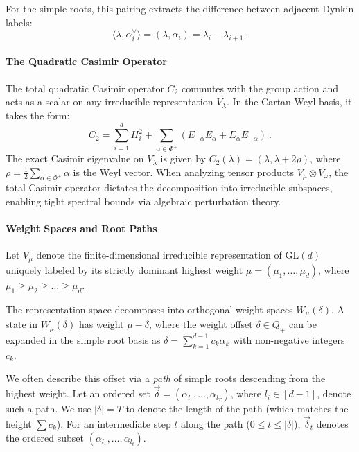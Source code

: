 \documentclass[11pt,letterpaper]{article}
\begin{document}
For the simple roots, this pairing extracts the difference between adjacent Dynkin labels:
\begin{equation}
    \langle \lambda, \alpha_i^\vee \rangle = (\lambda, \alpha_i) = \lambda_i - \lambda_{i+1} \ .
\end{equation}

\paragraph{The Quadratic Casimir Operator}
The total quadratic Casimir operator $C_2$ commutes with the group action and acts as a scalar on any irreducible representation $V_\lambda$. In the Cartan-Weyl basis, it takes the form:
\begin{equation}
    C_2 = \sum_{i=1}^d H_i^2 + \sum_{\alpha\in\Phi^+} (E_{-\alpha} E_\alpha + E_\alpha E_{-\alpha}) \ .
\end{equation}
The exact Casimir eigenvalue on $V_\lambda$ is given by $C_2(\lambda) = (\lambda, \lambda + 2\rho)$, where $\rho = \frac{1}{2} \sum_{\alpha \in\Phi^+} \alpha$ is the Weyl vector. When analyzing tensor products $V_\mu \otimes V_\omega$, the total Casimir operator dictates the decomposition into irreducible subspaces, enabling tight spectral bounds via algebraic perturbation theory.

\paragraph{Weight Spaces and Root Paths}
Let $V_\mu$ denote the finite-dimensional irreducible representation of $\mathrm{GL}(d)$ uniquely labeled by its strictly dominant highest weight $\mu = (\mu_1, \dots, \mu_d)$, where $\mu_1 \ge \mu_2 \ge \dots \ge \mu_d$. 

The representation space decomposes into orthogonal weight spaces $W_\mu(\delta)$. A state in $W_\mu(\delta)$ has weight $\mu - \delta$, where the weight offset $\delta \in Q_+$ can be expanded in the simple root basis as $\delta = \sum_{k=1}^{d-1} c_k \alpha_k$ with non-negative integers $c_k$. 

We often describe this offset via a \emph{path} of simple roots descending from the highest weight. Let an ordered set $\vec\delta=(\alpha_{l_1},\ldots, \alpha_{l_T})$, where $l_i\in[d-1]$, denote such a path. We use $|\delta| = T$ to denote the length of the path (which matches the height $\sum c_k$). For an intermediate step $t$ along the path ($0 \le t \le |\delta|$), $\vec\delta_t$ denotes the ordered subset $(\alpha_{l_1},\ldots, \alpha_{l_t})$. 
\end{document}
